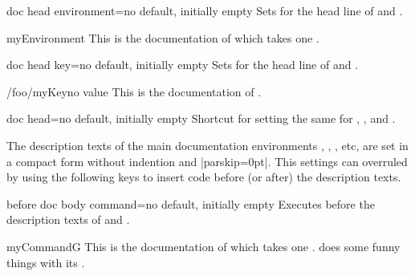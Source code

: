 \begin{docTcbKey}{doc head environment}{=}{no default, initially empty}
  Sets  for the head line of  and .
\begin{dispExample}

\begin{docEnvironment*}{myEnvironment}{}
  This is the documentation of  which
  takes one .
\end{docEnvironment*}
\end{dispExample}
\end{docTcbKey}

\begin{docTcbKey}{doc head key}{=}{no default, initially empty}
  Sets  for the head line of  and .
\begin{dispExample}

\begin{docKey*}{/foo/myKey}{}{no value}
  This is the documentation of .
\end{docKey*}
\end{dispExample}
\end{docTcbKey}

\begin{docTcbKey}{doc head}{=}{no default, initially empty}
  Shortcut for setting the same  for
  , ,
  and .
\end{docTcbKey}

\clearpage
The description texts of the main documentation environments ,
, , etc, are set in a compact form without
indention and |parskip=0pt|. This settings can overruled by using the following
keys to insert code before (or after) the description texts.

\begin{docTcbKey}[][doc new=2015-10-09]{before doc body command}{=}{no default, initially empty}
  Executes  before the description texts
  of  and .
\begin{dispExample}

\begin{docCommand*}{myCommandG}{}
  This is the documentation of  which takes one .
   does some funny things with its .
\end{docCommand*}
\end{dispExample}
\end{docTcbKey}


